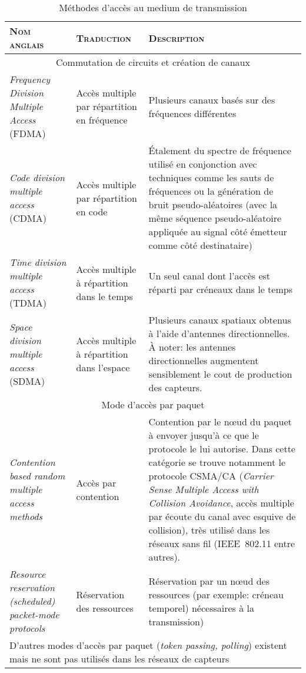 \begin{table}[!ht]
    \caption{Méthodes d'accès au medium de transmission}\label{ea:tab:mac}
    \centering
    \medskip
    \begin{small}
        \begin{tabular}{m{}|m{}|m{}}
            \toprule
            \textsc{Nom anglais} & \textsc{Traduction} & \textsc{Description}\\
            \midrule
            \multicolumn{3}{c}{Commutation de circuits et création de canaux}\\
            \midrule
            \textit{Frequency Division Multiple Access} (FDMA) & Accès multiple par répartition en fréquence & Plusieurs canaux basés sur des fréquences différentes\\
            \midrule
            \textit{Code division multiple access} (CDMA) & Accès multiple par répartition en code & Étalement du spectre de fréquence utilisé en conjonction avec techniques comme les sauts de fréquences ou la génération de bruit pseudo-aléatoires (avec la même séquence pseudo-aléatoire appliquée au signal côté émetteur comme côté destinataire)\\
            \midrule
            \textit{Time division multiple access} (TDMA) & Accès multiple à répartition dans le temps & Un seul canal dont l'accès est réparti par créneaux dans le temps\\
            \midrule
            \textit{Space division multiple access} (SDMA) & Accès multiple à répartition dans l'espace & Plusieurs canaux spatiaux obtenus à l'aide d'antennes directionnelles. À noter: les antennes directionnelles augmentent sensiblement le cout de production des capteurs.\\
            \midrule
            \multicolumn{3}{c}{Mode d'accès par paquet}\\
            \midrule
            \textit{Contention based random multiple access methods} & Accès par contention & Contention par le nœud du paquet à envoyer jusqu'à ce que le protocole le lui autorise. Dans cette catégorie se trouve notamment le protocole CSMA/CA (\textit{Carrier Sense Multiple Access with Collision Avoidance}, accès multiple par écoute du canal avec esquive de collision), très utilisé dans les réseaux sans fil (IEEE~802.11 entre autres).\\
            \midrule
            \textit{Resource reservation (scheduled) packet-mode protocols} & Réservation des ressources & Réservation par un nœud des ressources (par exemple: créneau temporel) nécessaires à la transmission)\\
            \midrule
            \multicolumn{3}{p{.95\textwidth}}{D'autres modes d'accès par paquet (\textit{token passing, polling}) existent mais ne sont pas utilisés dans les réseaux de capteurs}\\
            \bottomrule
         \end{tabular}
     \end{small}
\end{table}

